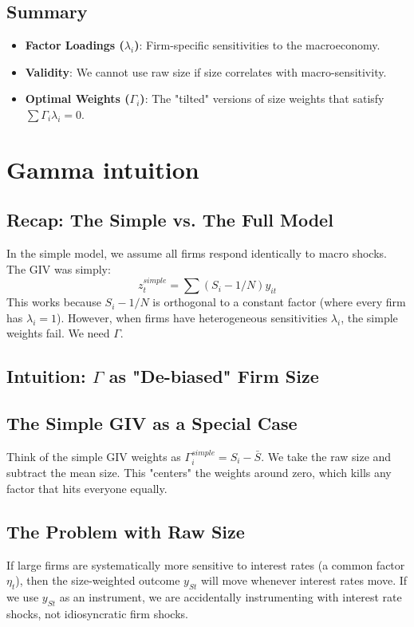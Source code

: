 \documentclass[12pt]{article}
\begin{document}
\subsection{Summary}
\begin{itemize}
    \item \textbf{Factor Loadings ($\lambda_i$)}: Firm-specific sensitivities to the macroeconomy.
    \item \textbf{Validity}: We cannot use raw size if size correlates with macro-sensitivity.
    \item \textbf{Optimal Weights ($\Gamma_i$)}: The "tilted" versions of size weights that satisfy $\sum \Gamma_i \lambda_i = 0$.
\end{itemize}


\section{Gamma intuition}


\subsection{Recap: The Simple vs. The Full Model}
In the simple model, we assume all firms respond identically to macro shocks. The GIV was simply:
\begin{equation}
    z_t^{simple} = \sum (S_i - 1/N) y_{it}
\end{equation}
This works because $S_i - 1/N$ is orthogonal to a constant factor (where every firm has $\lambda_i = 1$). However, when firms have heterogeneous sensitivities $\lambda_i$, the simple weights fail. We need $\Gamma$.

\subsection{Intuition: $\Gamma$ as "De-biased" Firm Size}

\subsection{The Simple GIV as a Special Case}
Think of the simple GIV weights as $\Gamma_i^{simple} = S_i - \bar{S}$. We take the raw size and subtract the mean size. This "centers" the weights around zero, which kills any factor that hits everyone equally.

\subsection{The Problem with Raw Size}
If large firms are systematically more sensitive to interest rates (a common factor $\eta_t$), then the size-weighted outcome $y_{St}$ will move whenever interest rates move. If we use $y_{St}$ as an instrument, we are accidentally instrumenting with interest rate shocks, not idiosyncratic firm shocks.
\end{document}

